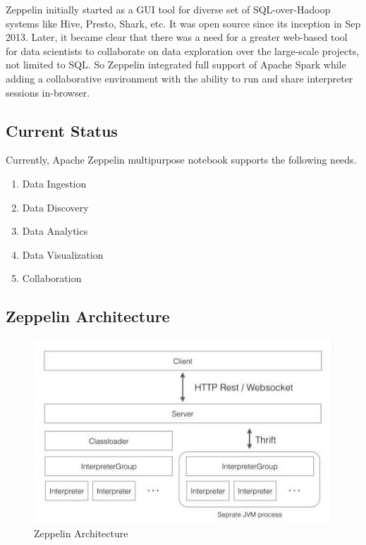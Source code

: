 \documentclass[9pt,twocolumn,twoside]{../../styles/osajnl}
\begin{document}
Zeppelin initially started as a GUI tool for diverse set of 
SQL-over-Hadoop systems like Hive, Presto, Shark, etc. It was open 
source since its inception in Sep 2013. Later, it became clear that 
there was a need for a greater web-based tool for data scientists to 
collaborate on data exploration over the large-scale projects, not 
limited to SQL. So Zeppelin integrated full support of Apache Spark 
while adding a collaborative environment with the ability to run and 
share interpreter sessions in-browser.

\subsection{Current Status}

Currently, Apache Zeppelin multipurpose notebook supports the 
following needs.
\begin{enumerate}
	\item Data Ingestion
	\item Data Discovery
	\item Data Analytics
	\item Data Visualization
	\item Collaboration
\end{enumerate}

\subsection{Zeppelin Architecture}

\begin{figure}
	\includegraphics[width=\linewidth]{./images/zeppelin-arch}
	\caption{Zeppelin Architecture}
	\label{fig:Zeppelin Architecture}
\end{figure}
\end{document}
